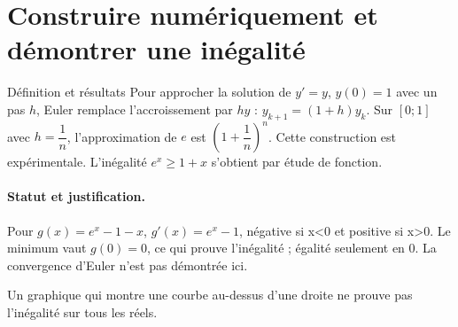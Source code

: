 \section{Construire numériquement et démontrer une inégalité}\label{C09-U5}
\begin{repere}{Définition et résultats}
Pour approcher la solution de $y\prime=y$, $y(0)=1$ avec un pas $h$, Euler remplace l’accroissement par $hy$ : $y_{k+1}=(1+h)y_k$. Sur $[0;1]$ avec $h=\dfrac1n$, l’approximation de $e$ est $\left(1+\dfrac1n\right)^n$. Cette construction est expérimentale. L’inégalité $e^x\geq1+x$ s’obtient par étude de fonction.
\end{repere}
\paragraph{Statut et justification.} Pour $g(x)=e^x-1-x$, $g\prime(x)=e^x-1$, négative si x<0 et positive si x>0. Le minimum vaut $g(0)=0$, ce qui prouve l’inégalité ; égalité seulement en 0. La convergence d’Euler n’est pas démontrée ici.
\label{C09-EX5}
\begin{erreur}Un graphique qui montre une courbe au-dessus d’une droite ne prouve pas l’inégalité sur tous les réels.\end{erreur}
\label{C09-AP5}
